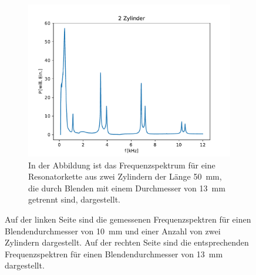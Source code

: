 \begin{figure}[ht]
\begin{subfigure}[b]{0.45\textwidth}
                    \includegraphics[scale=0.45]{./pictures/1dim_2_Zylinder_13mm.pdf}
                    \caption{In der Abbildung ist das Frequenzspektrum für eine Resonatorkette aus zwei Zylindern der Länge \SI{50}{\milli\metre}, die durch Blenden mit einem Durchmesser von \SI{13}{\milli\metre} getrennt sind, dargestellt.}
                    \label{fig:1dim_2_Zylinder_13mm}
                \end{subfigure}
                \caption{Auf der linken Seite sind die gemessenen Frequenzspektren für einen Blendendurchmesser von \SI{10}{\milli\metre} und einer Anzahl von zwei Zylindern dargestellt. Auf der rechten Seite sind die entsprechenden Frequenzspektren für einen Blendendurchmesser von \SI{13}{\milli\metre} dargestellt.}
                \label{10mm_16mm_blende}
            \end{figure}
            \FloatBarrier
